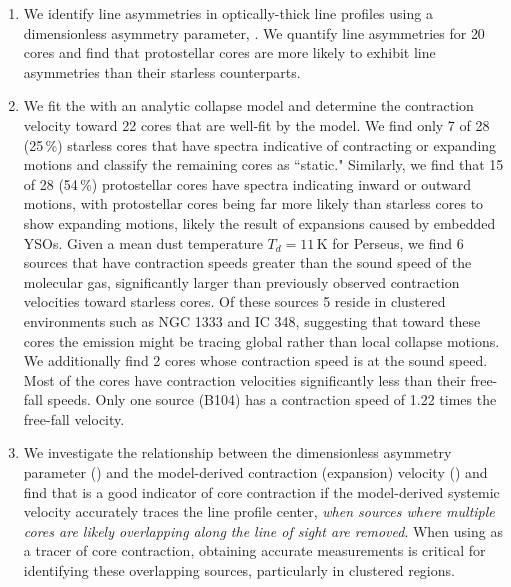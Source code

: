 \documentclass[iop,twocolappendix]{emulateapj}
\begin{document}
\begin{enumerate}

\item We identify line asymmetries in optically-thick {\HCO} line profiles using a dimensionless asymmetry parameter, {\deltaV} \citep{Mardones1997}. We quantify line asymmetries for 20 cores  and find that protostellar cores are more likely to exhibit line asymmetries than their starless counterparts.

\item We fit the  with an analytic collapse model \citep{DeVries2005} and determine the contraction velocity toward 22 cores that are well-fit by the model. We find only 7 of 28 (25\,\%)  starless cores that have spectra indicative of contracting or expanding motions and classify the remaining cores as ``static." Similarly, we find that 15 of 28 (54\,\%)  protostellar cores have spectra indicating inward or outward motions, with protostellar cores being far more likely than starless cores to show expanding motions, likely the result of expansions caused by embedded YSOs. Given a mean dust temperature $T_d = 11$\,K for Perseus, we find 6 sources that have contraction speeds greater than the sound speed of the molecular gas, significantly larger than previously observed contraction velocities toward starless cores. Of these sources 5 reside in clustered environments such as NGC 1333 and IC 348, suggesting that toward these cores the {\HCO} emission might be tracing global rather than local collapse motions. We additionally find 2 cores whose contraction speed is at the sound speed. Most of the cores have contraction velocities significantly less than their free-fall speeds. Only one source (B104) has a contraction speed of 1.22 times the free-fall velocity.

\item We investigate the relationship between the dimensionless asymmetry parameter ({\deltaV}) and the model-derived contraction (expansion) velocity ({\Vin}) and find that {\deltaV} is a good indicator of core contraction if the model-derived systemic velocity accurately traces the line profile center, \emph{when sources where multiple cores are likely overlapping along the line of sight are removed}. When using {\deltaV} as a tracer of core contraction, obtaining accurate {\Vthin} measurements is critical for identifying these overlapping sources, particularly in clustered regions. 


\end{enumerate}
\end{document}
